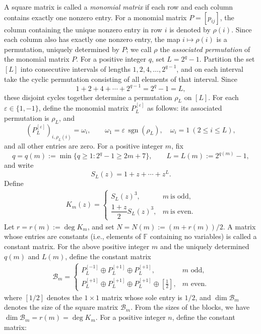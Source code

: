 \documentclass[11pt,a4paper]{article}
\begin{document}
A square matrix is called a {\em monomial matrix} if each row and each column contains exactly one nonzero entry. For a monomial matrix $P=[p_{ij}]$, the column containing the unique nonzero entry in row $i$ is denoted by $\rho(i)$. Since each column also has exactly one nonzero entry, the map $i\mapsto\rho(i)$ is a permutation, uniquely determined by $P$; we call $\rho$ the {\em associated permutation} of the monomial matrix $P$. For a positive integer $q$, set $L=2^q-1$. Partition the set $[L]$ into consecutive intervals of lengths
$1,2,4,\ldots,2^{q-1}$, and on each interval take the cyclic permutation consisting of all elements of that interval. Since
\[
  1+2+4+\cdots+2^{q-1}=2^q-1=L,
\]
these disjoint cycles together determine a permutation $\rho_L$ on $[L]$. For each $\varepsilon\in\{1,-1\}$, define the monomial matrix $P_L^{[\varepsilon]}$ as follows: its associated permutation is $\rho_L$, and
\[
  (P_L^{[\varepsilon]})_{i,\rho_L(i)}=\omega_i,
  \qquad
  \omega_1=\varepsilon\,\operatorname{sgn}(\rho_L),\quad
  \omega_i=1\ (2\leq i\leq L),
\]
and all other entries are zero. For a positive integer $m$, fix
\[
  q=q(m):=\min\{q\geq1:2^q-1\geq2m+7\},
  \qquad L=L(m):=2^{q(m)}-1,
\]
and write
\[
  S_L(z)=1+z+\cdots+z^L.
\]
Define
\begin{eqnarray}\label{equ9}
  K_m(z)=
  \begin{cases}
    S_L(z)^3,&m~\text{is odd},\\[1mm]
    \dfrac{1+z}{2}S_L(z)^3,&m~\text{is even}.
  \end{cases}
\end{eqnarray}
Let $r=r(m):=\deg K_m$, and set $N=N(m):=(m+r(m))/2$. A matrix whose entries are constants (i.e., elements of $\mathbb{F}$ containing no variables) is called a constant matrix. For the above positive integer $m$ and the uniquely determined $q(m)$ and $L(m)$, define the constant matrix
\begin{eqnarray*}
  \mathcal B_m=
  \begin{cases}
    P_L^{[-1]}\oplus P_L^{[+1]}\oplus P_L^{[+1]},
      &m\text{ odd},\\[1mm]
    P_L^{[+1]}\oplus P_L^{[+1]}\oplus P_L^{[+1]}\oplus[\frac12],
      &m\text{ even}.
  \end{cases}
\end{eqnarray*}
where $[1/2]$ denotes the $1\times1$ matrix whose sole entry is $1/2$, and $\dim\mathcal B_m$ denotes the size of the square matrix $\mathcal B_m$. From the sizes of the blocks, we have $\dim\mathcal B_m=r(m)=\deg K_m$. For a positive integer $n$, define the constant matrix:
\end{document}
